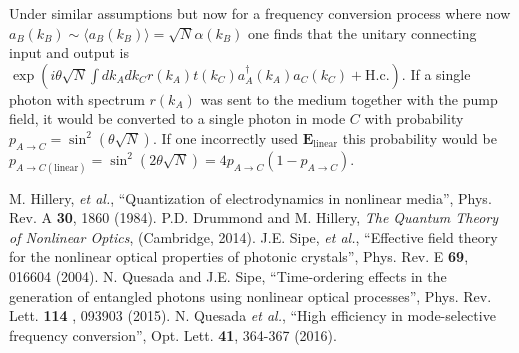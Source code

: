 \documentclass[letterpaper,10pt]{article}
\newcommand{\ea}{\emph{et al.}}
\newcommand{\braket}[1]{\langle #1 \rangle}
\newcommand{\hc}{\text{H.c.}}
\begin{document}
Under similar assumptions but now for a frequency conversion process where now $a_B(k_B) \sim \braket{a_B(k_B)}=\sqrt{N} \alpha(k_B)$ one finds that the unitary connecting input and output is $\exp\left(i \theta \sqrt{N}\int dk_A dk_C r(k_A) t(k_C)  a_A^\dagger(k_A) a_C(k_C)+\hc\right)$\cite{nico2}. If a single photon with spectrum $r(k_A)$ was sent to the medium together with the pump field, it would be converted to a single photon in mode $C$ with probability $p_{A \to C}=\sin^2 (\theta \sqrt{N})$. If one incorrectly used $\textbf{E}_{\text{linear}}$ this probability would be $p_{A \to C (\text{linear})}=\sin^2 (2\theta \sqrt{N})=4 p_{A \to C}(1-p_{A \to C})$.
\begin{thebibliography}{99}
 M. Hillery, \emph{et al.}, ``Quantization of electrodynamics in nonlinear media'', Phys. Rev. A {\bf 30}, 1860 (1984).
 P.D. Drummond and M. Hillery, \emph{The Quantum Theory of Nonlinear Optics}, (Cambridge, 2014).
 J.E. Sipe, \emph{et al.}, ``Effective field theory for the nonlinear optical properties of photonic crystals'', Phys. Rev. E {\bf 69}, 016604 (2004).
 N. Quesada and J.E. Sipe, ``Time-ordering effects in the generation of entangled photons using nonlinear optical processes'', Phys. Rev. Lett. {\bf 114} , 093903 (2015).
 N. Quesada \ea, ``High efficiency in mode-selective frequency conversion'', Opt. Lett. {\bf 41}, 364-367 (2016).
\end{thebibliography}
\end{document}

